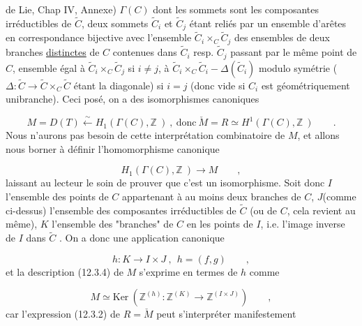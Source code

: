 de Lie, Chap IV, Annexe) $\Gamma(C)$ dont les sommets sont les composantes irréductibles de $\widetilde{C}$, deux sommets $\widetilde{C}_i$ et $\widetilde{C}_j$ étant reliés par un ensemble d'arêtes en correspondance bijective avec l'ensemble $\widetilde{C}_i \times_C \widetilde{C}_j$ des ensembles de deux branches \underline{distinctes} de $C$ contenues dans $\widetilde{C}_i$ resp. $\widetilde{C}_j$ passant par le même point de $C$, ensemble égal à $\widetilde{C}_i \times_C \widetilde{C}_j$ si $i \neq j$, à $\widetilde{C}_i \times_C \widetilde{C}_i - \Delta(\widetilde{C}_i)$ modulo symétrie ($\Delta : \widetilde{C} \longrightarrow \widetilde{C} \times_C \widetilde{C}$ étant la diagonale) si $i=j$ (donc vide si $C_i$ est géométriquement unibranche). Ceci posé, on a des isomorphismes canoniques

\begin{equation}\tag{12.3.7}
M = D(T) \stackrel{\sim}{\longleftarrow} H_1(\Gamma(C),\mathbb{Z}\ )\ ,\ \mbox{donc}\ \check{M} = R \simeq H^{1}(\Gamma(C),\mathbb{Z}\ )\qquad .
\end{equation}
Nous n'aurons pas besoin de cette interprétation combinatoire de $M$, et allons nous borner à définir l'homomorphisme canonique

\begin{equation}\tag{12.3.8}
H_1(\Gamma(C),\mathbb{Z}\ ) \longrightarrow M \qquad ,
\end{equation}
laissant au lecteur le soin de prouver que c'est un isomorphisme. Soit donc $I$ l'ensemble des points de $C$ appartenant à au moins deux branches de $C$, $J$(comme ci-dessus) l'ensemble des composantes irréductibles de $\widetilde{C}$ (ou de $C$, cela revient au même), $K$ l'ensemble des "branches" de $C$ en les points de $I$, i.e. l'image inverse de $I$ dans $\widetilde{C}$ . On a donc une application canonique

\begin{equation}\tag{12.3.9}
h : K \longrightarrow I \times J\ ,\ \ h = (f,g)\qquad ,
\end{equation}
et la description (12.3.4) de $M$ s'exprime en termes de $h$ comme

\begin{equation}\tag{12.3.10}
M \simeq \mathrm{Ker}\ (\mathbb{Z}^{(h)} : \mathbb{Z}^{(K)} \longrightarrow \mathbb{Z}^{(I \times J)})\qquad ,
\end{equation}
car l'expression (12.3.2) de $R = \check{M}$ peut s'interpréter manifestement



